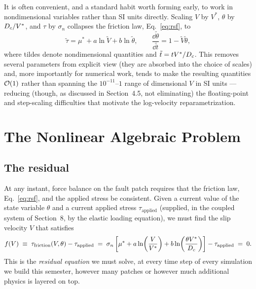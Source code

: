 It is often convenient, and a standard habit worth forming early, to work in nondimensional variables rather than SI units directly. Scaling $V$ by $V^\ast$, $\theta$ by $D_c/V^\ast$, and $\tau$ by $\sigma_n$ collapses the friction law, Eq.~\eqref{eq:rsf}, to
\begin{equation}
\tilde\tau = \mu^\ast + a\ln\tilde V + b\ln\tilde\theta, \qquad \frac{\dd\tilde\theta}{\dd \tilde t} = 1 - \tilde V\tilde\theta,
\end{equation}
where tildes denote nondimensional quantities and $\tilde t = t V^\ast/D_c$. This removes several parameters from explicit view (they are absorbed into the choice of scales) and, more importantly for numerical work, tends to make the resulting quantities $\mathcal{O}\!\left(1\right)$ rather than spanning the $10^{-11}$--$1$ range of dimensional $V$ in SI units --- reducing (though, as discussed in Section~4.5, not eliminating) the floating-point and step-scaling difficulties that motivate the log-velocity reparametrization.

\section{The Nonlinear Algebraic Problem}

\subsection{The residual}

At any instant, force balance on the fault patch requires that the friction law, Eq.~\eqref{eq:rsf}, and the applied stress be consistent. Given a current value of the state variable $\theta$ and a current applied stress $\tau_{\mathrm{applied}}$ (supplied, in the coupled system of Section~8, by the elastic loading equation), we must find the slip velocity $V$ that satisfies
\begin{equation}
f(V) \;\equiv\; \tau_{\mathrm{friction}}(V, \theta) - \tau_{\mathrm{applied}} \;=\; \sigma_n\left[\mu^\ast + a \ln\!\left(\frac{V}{V^\ast}\right) + b \ln\!\left(\frac{\theta V^\ast}{D_c}\right)\right] - \tau_{\mathrm{applied}} \;=\; 0.
\label{eq:residual}
\end{equation}
This is the \emph{residual equation} we must solve, at every time step of every simulation we build this semester, however many patches or however much additional physics is layered on top.

